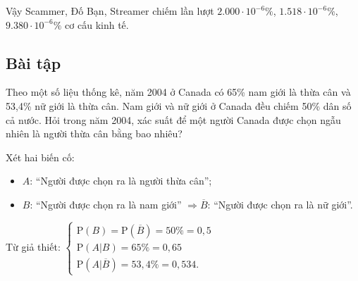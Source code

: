 \documentclass[twoside,final]{hcmut-report}
\newcommand{\exercise}[1]{\begin{exercisebox}#1\end{exercisebox}}
\begin{document}
Vậy Scammer, Đố Bạn, Streamer chiếm lần lượt $2.000\cdot 10^{-6}\%$, $1.518\cdot 10^{-6}\%$, $9.380\cdot 10^{-6}\%$ cơ cấu kinh tế.
\subsection{Bài tập}
\exercise{Theo một số liệu thống kê, năm 2004 ở Canada có 65\% nam giới là thừa cân và 53,4\% nữ giới là thừa cân. Nam giới và nữ giới ở Canada đều chiếm 50\% dân số cả nước. Hỏi trong năm 2004, xác suất để một người Canada được chọn ngẫu nhiên là người thừa cân bằng bao nhiêu?}

Xét hai biến cố:
\begin{itemize}[itemsep=0pt, topsep=0pt, parsep=0pt,label=-]
    \item $A$: ``Người được chọn ra là người thừa cân'';
    \item $B$: ``Người được chọn ra là nam giới'' $\Rightarrow\overline{B}$: ``Người được chọn ra là nữ giới''.
\end{itemize}

Từ giả thiết:
$\begin{cases}
        \mathrm{P}(B) = \mathrm{P}(\overline{B}) = 50\% = 0{,}5 \\
        \mathrm{P}(A | B) = 65\% = 0{,}65                       \\
        \mathrm{P}(A | \overline{B}) = 53{,}4\% = 0{,}534.
    \end{cases}$
\end{document}
